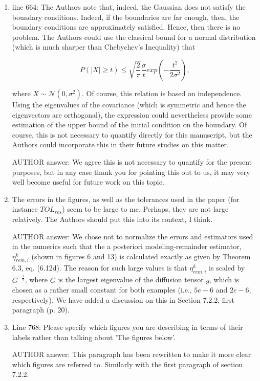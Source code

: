 \documentclass[a4paper,11pt]{scrartcl}
\begin{document}
\begin{enumerate}
\item
line 664: The Authors note that, indeed, the Gaussian does not satisfy the boundary conditions. Indeed, if the boundaries are far enough, then, the boundary conditions are approximately satisfied. Hence, then there is no problem. The Authors could use the classical bound for a normal distribution (which is much sharper than Chebychev's Inequality) that

$$P(|X| \ge t ) \le \sqrt{\frac{2}{\pi}} \frac{\sigma}{t} exp(-\frac{t^2}{2 \sigma^2}),$$

where $X \sim \mathcal{N}(0,\sigma^2)$. Of course, this relation is based on independence. Using the eigenvalues of the covariance (which is symmetric and hence the eigenvectors are orthogonal), the expression could nevertheless provide some estimation of the upper bound of the initial condition on the boundary.
Of course, this is not necessary to quantify directly for this manuscript, but the Authors could incorporate this in their future studies on this matter.

AUTHOR answer: We agree this is not necessary to quantify for the present purposes, but in any case thank you for pointing this out to us, it may very well become useful for future work on this topic.

\item
The errors in the figures, as well as the tolerances used in the paper (for instance $TOL_{res}$) seem to be large to me. Perhaps, they are not large relatively. The Authors should put this into its context, I think.

AUTHOR answer: We chose not to normalize the errors and estimators used in the numerics such that the a posteriori modeling-remainder estimator, $\eta_{rem,i}^k$ (shown in figures 6 and 13) is calculated exactly as given by Theorem 6.3, eq. (6.12d). The reason for such large values is that $\eta_{rem,i}^k$ is scaled by $G^{-\frac{1}{2}}$, where $G$ is the largest eigenvalue of the diffusion tensor $g$, which is chosen as a rather small constant for both examples (i.e., $5e-6$ and $2e-6$, respectively). We have added a discussion on this in Section 7.2.2, first paragraph (p. 20).

\item
Line 768: Please specify which figures you are describing in terms of their labels rather than talking about 'The figures below'.

AUTHOR answer: This paragraph has been rewritten to make it more clear which figures are referred to. Similarly with the first paragraph of section 7.2.2.


\end{enumerate}
\end{document}

